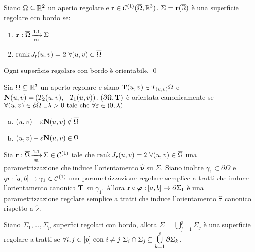 \begin{definition}
	Siano $\Omega \subseteq \mathbb{R}^2$ un aperto regolare e $\vb{r} \in \mathcal{C}^{(1)}(\overline{\Omega},\mathbb{R}^3)$. $\Sigma = \vb{r}(\overline{\Omega})$ è una superficie regolare con bordo se:
	\begin{enumerate}
		\item $\vb{r}:\overline{\Omega}\operatorname{\xrightarrow[\operatorname{su}]{\operatorname{1-1}}}\Sigma$
		\item $\rank J_{\vb{r}}(u,v) = 2 \ \forall (u,v) \in \overline{\Omega}$
	\end{enumerate}
\end{definition}

\begin{theorem}
	Ogni superficie regolare con bordo è orientabile. \qed
\end{theorem}

\begin{definition}
	Sia $\Omega \subseteq \mathbb{R}^2$ un aperto regolare e siano $\vb{T}(u,v)\in T_{(u,v)}\Omega$ e $\vb{N}(u,v)=(T_2(u,v),-T_1(u,v))$. $(\partial \Omega, \vb{T})$ è orientata canonicamente se $\forall (u,v) \in \partial \Omega \ \exists \lambda > 0 \text{ tale che } \forall \varepsilon \in (0,\lambda)$
	\begin{enumerate}[a.]
		\item $(u,v)+\varepsilon\vb{N}(u,v) \notin \overline{\Omega}$
		\item $(u,v)-\varepsilon\vb{N}(u,v) \in \Omega$
	\end{enumerate}
\end{definition}

\begin{definition}
	Sia $\vb{r}: \overline{\Omega} \operatorname{\xrightarrow[\operatorname{su}]{\operatorname{1-1}}} \Sigma \in \mathcal{C}^{(1)}$ tale che $\rank J_{\vb{r}}(u,v)=2 \ \forall (u,v) \in \overline{\Omega}$ una parametrizzazione che induce l'orientamento $\hat{\bm\nu}$ su $\Sigma$. Siano inoltre $\gamma_1 \subset \partial\Omega$ e $\bm\varphi: [a,b]\to \gamma_1 \in \mathcal{C}^{(1)}$ una parametrizzazione regolare semplice a tratti che induce l'orientamento canonico $\vb{T}$ su $\gamma_1$.
	Allora $\vb{r}\circ \bm\varphi:[a,b]\to \partial\Sigma_1$ è una parametrizzazione regolare semplice a tratti che induce l'orientamento $\hat{\bm\tau}$ canonico rispetto a $\hat{\bm\nu}$.
\end{definition}

\begin{definition}
	Siano $\Sigma_1,\dots,\Sigma_p$ superfici regolari con bordo, allora $\Sigma = \bigcup\limits_{j=1}^p \Sigma_j$ è una superficie regolare a tratti se $\forall i,j \in [p] \text{ con } i \neq j \ \Sigma_i \cap \Sigma_j \subseteq \bigcup\limits_{k=1}^p\partial \Sigma_k$.
\end{definition}

